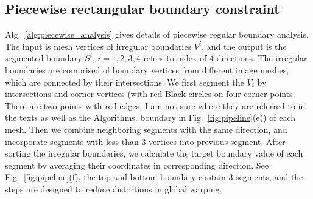 \documentclass[10pt,journal,compsoc]{IEEEtran}
\newcommand{\zfl}[1]{{\color{red}#1}}
\begin{document}
\begin{comment}
\begin{figure}[t] %
  \centering
  \texttt{[image: polybool]}

  \caption{Flowchart of irregular Pipeline of \emph{StereoPasting}. In the preprocessing step, we first select and triangulate the 2D foreground, then estimate the disparity map of the target scene. After that we edit the disparity map of the 2D foreground by painting strokes and blend it with the 3D background for depth-consistent composition. At last, the 2D foreground is warped and blended into the target image pair to get the composition results.} \label{fig:polybool}
\end{figure}

\begin{comment}
\begin{figure}[t] %
  \centering
  \texttt{[image: polybool2]}
  \caption{A challenging example of irregular boundary construction.} \label{fig:polybool2}
\end{figure}
\end{comment}

\subsection{Piecewise rectangular boundary constraint}

Alg.~\ref{alg:piecewise_analysis} gives details of piecewise regular boundary analysis.
The input is mesh vertices of irregular boundaries $V^i$, and the output is the segmented boundary $S^i$, $i=1,2,3,4$ refers to index of $4$ directions.
The irregular boundaries are comprised of boundary vertices from different image meshes, which are connected by their intersections.
We first segment the $V_i$ by intersections and corner vertices (with red \zfl{Black circles on four corner points. There are two points with red edges, I am not sure where they are referred to in the texts as well as the Algorithms.} boundary in Fig.~\ref{fig:pipeline}(e)) of each mesh.
Then we combine neighboring segments with the same direction, and incorporate segments with less than $3$ vertices into previous segment.
After sorting the irregular boundaries, we calculate the target boundary value of each segment by averaging their coordinates in corresponding direction.
See Fig.~\ref{fig:pipeline}(f), the top and bottom boundary contain $3$ segments, and the steps are designed to reduce distortions in global warping.
\end{document}

